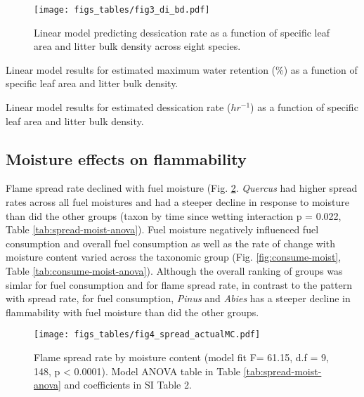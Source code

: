 \documentclass[fire,article,submit,moreauthors,pdftex]{Definitions/mdpi}
\begin{document}
\begin{figure}[H]
  \centering
\texttt{[image: figs\_tables/fig3\_di\_bd.pdf]}
\caption{Linear model predicting dessication rate as a function of specific leaf area and litter bulk density across eight species.}
  \label{fig:bd-di}
\end{figure}

\begin{table}[H]
  \caption{Linear model results for estimated maximum water retention (\%) as a function of specific leaf area and litter bulk density.}
  \label{tab2:mc-anova}
\centering

\end{table}


\begin{table}[H]
  \caption{Linear model results for estimated dessication rate ($hr^{-1}$) as a function of specific leaf area and litter bulk density.}
  \label{tab2:di-anova}
\centering

\end{table}



\subsection{Moisture effects on flammability}


Flame spread rate declined with fuel moisture (Fig. \ref{fig:spread-moist}. \emph{Quercus} had higher spread rates across all fuel moistures and had a steeper decline in response to moisture than did the other groups (taxon by time since wetting interaction p = 0.022, Table \ref{tab:spread-moist-anova}). Fuel moisture negatively influenced fuel consumption and overall  fuel consumption as well as the rate of change with moisture content varied across the taxonomic group (Fig. \ref{fig:consume-moist}, Table \ref{tab:consume-moist-anova}). Although the overall ranking of groups was simlar for fuel consumption and for flame spread rate, in contrast to the pattern with spread rate, for fuel consumption, \emph{Pinus} and \emph{Abies} has a steeper decline in flammability with fuel moisture than did the other groups.

\begin{figure}[H]
  \centering
\texttt{[image: figs\_tables/fig4\_spread\_actualMC.pdf]}
\caption{Flame spread rate by moisture content (model fit F= 61.15, d.f = 9, 148,  p < 0.0001). Model ANOVA table in Table \ref{tab:spread-moist-anova} and coefficients in SI Table 2.}
  \label{fig:spread-moist}
\end{figure}
\end{document}
